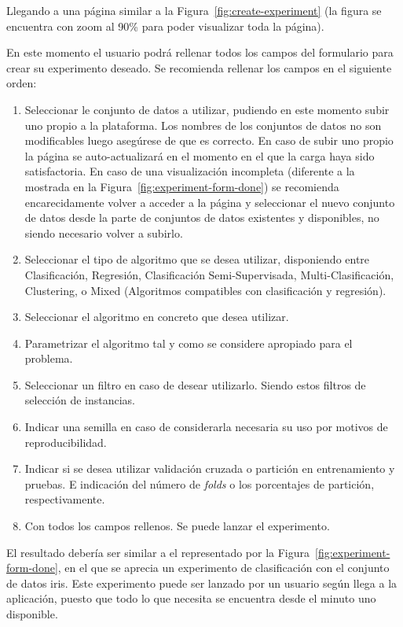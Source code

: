 
Llegando a una página similar a la Figura~\ref{fig:create-experiment} (la figura se encuentra con zoom al 90\% para poder visualizar toda la página). 

En este momento el usuario podrá rellenar todos los campos del formulario para crear su experimento deseado. Se recomienda rellenar los campos en el siguiente orden:
\begin{enumerate}
\item Seleccionar le conjunto de datos a utilizar, pudiendo en este momento subir uno propio a la plataforma. Los nombres de los conjuntos de datos no son modificables luego asegúrese de que es correcto. En caso de subir uno propio la página se auto-actualizará en el momento en el que la carga haya sido satisfactoria. En caso de una visualización incompleta (diferente a la mostrada en la Figura~\ref{fig:experiment-form-done}) se recomienda encarecidamente volver a acceder a la página y seleccionar el nuevo conjunto de datos desde la parte de conjuntos de datos existentes y disponibles, no siendo necesario volver a subirlo.
\item Seleccionar el tipo de algoritmo que se desea utilizar, disponiendo entre Clasificación, Regresión, Clasificación Semi-Supervisada, Multi-Clasificación, Clustering, o Mixed (Algoritmos compatibles con clasificación y regresión).
\item Seleccionar el algoritmo en concreto que desea utilizar.
\item Parametrizar el algoritmo tal y como se considere apropiado para el problema.
\item Seleccionar un filtro en caso de desear utilizarlo. Siendo estos filtros de selección de instancias.
\item Indicar una semilla en caso de considerarla necesaria su uso por motivos de reproducibilidad.
\item Indicar si se desea utilizar validación cruzada o partición en entrenamiento y pruebas. E indicación del número de \textit{folds} o los porcentajes de partición, respectivamente.
\item Con todos los campos rellenos. Se puede lanzar el experimento.
\end{enumerate}

El resultado debería ser similar a el representado por la Figura~\ref{fig:experiment-form-done}, en el que se aprecia un experimento de clasificación con el conjunto de datos iris. Este experimento puede ser lanzado por un usuario según llega a la aplicación, puesto que todo lo que necesita se encuentra desde el minuto uno disponible.

